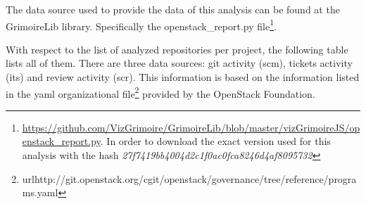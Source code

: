 \documentclass[a4wide,11pt]{report}
\begin{document}
The data source used to provide the data of this analysis can be found at the GrimoireLib library. Specifically the openstack\_report.py file\footnote{\url{https://github.com/VizGrimoire/GrimoireLib/blob/master/vizGrimoireJS/openstack_report.py}. In order to download the exact version used for this analysis with the hash \emph{27f7419bb4004d2c1f0ac0fca8246d4af8095732}}. 


With respect to the list of analyzed repositories per project, the following table lists all of them.
There are three data sources: git activity (scm), tickets activity (its) and review activity (scr). This information is based on the information listed in the yaml organizational file\footnote{url{http://git.openstack.org/cgit/openstack/governance/tree/reference/programs.yaml}} provided by the OpenStack Foundation.



\end{document}
